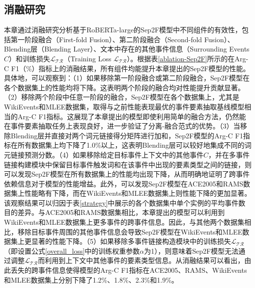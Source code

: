 \subsection{消融研究}
本章通过消融研究分析基于RoBERTa-large的Sep2F模型中不同组件的有效性，包括第一阶段融合（First-fold Fusion）、第二阶段融合（Second-fold Fusion）、Blending层（Blending Layer）、文本中存在的其他事件信息（Surrounding Events $C$）和训练损失$\mathcal{L_\textrm{TR}}$（Training Loss $\mathcal{L_\textrm{TR}}$）。根据表\ref{ablation-Sep2F}所示的在Arg-C F1（\%）指标上的消融结果，所有组件均能提升本章提出的Sep2F模型的性能。具体地，可以观察到：（1）如果移除第一阶段融合或第二阶段融合，Sep2F模型在各个数据集上的性能均将下降。这表明两个阶段的融合均对性能提升贡献显著。（2）移除两个阶段中任意一阶段的融合，Sep2F模型在各个数据集上，尤其是WikiEvents和MLEE数据集，取得与之前性能表现最优的事件要素抽取基线模型相当的Arg-C F1指标。这展现了本章提出的模型即使利用简单的融合方法，仍然能在事件要素抽取任务上表现良好，进一步验证了分离-融合范式的优势。（3）当移除Blending层并直接对两个词元链接得分矩阵进行加和，Sep2F模型的Arg-C F1指标在所有数据集上均下降了1.0\%以上，这表明Blending层可以较好地集成不同的词元链接预测分数。（4）如果移除给定目标事件上下文中的其他事件$C$，并在多事件链接构建模块中保留目标事件触发词和在该事件中出现的要素类型之间的链接，则可以发现Sep2F模型在所有数据集上的性能均出现下降，从而明确地证明了跨事件依赖信息对于模型的性能增益。此外，可以发现Sep2F模型在ACE2005和RAMS数据集上性能略有下降，而在WikiEvents和MLEE数据集上则性能下降的更加显著。该观察结果可以归因于表\ref{strategy}中展示的各个数据集中单个实例的平均事件数目的差异。与ACE2005和RAMS数据集相比，本章提出的模型可以利用到WikiEvents和MLEE数据集上更多事件的跨事件信息。因此，与其他两个数据集相比，移除目标事件周围的其他事件信息会导致Sep2F模型在WikiEvents和MLEE数据集上更显著的性能下降。（5）如果移除多事件链接构造模块中的训练损失$\mathcal{L_\textrm{TR}}$（即设置公式\ref{overall_loss}中的训练权重参数$\alpha$为1），则意味着Sep2F模型无法通过调整$\mathcal{L_\textrm{TR}}$而利用到上下文中其他事件的要素类型信息。从消融结果可以看出，由此丢失的跨事件信息使得模型的Arg-C F1指标在ACE2005、RAMS、WikiEvents和MLEE数据集上分别下降了1.2\%、1.8\%、2.3\%和1.9\%。


